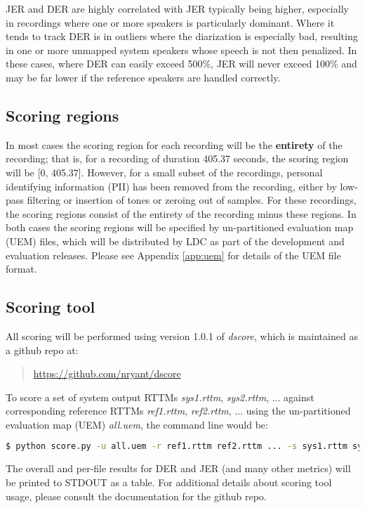 \documentclass{article}
\begin{document}
JER and DER are highly correlated with JER typically being higher, especially in recordings where one or more speakers is particularly dominant. Where it tends to track DER is in outliers where the diarization is especially bad, resulting in one or more unmapped system speakers whose speech is not then penalized. In these cases, where DER can easily exceed 500\%, JER will never exceed 100\% and may be far lower if the reference speakers are handled correctly. 


\subsection{Scoring regions}
In most cases the scoring region for each recording will be the {\bf entirety} of the recording; that is, for a recording of duration 405.37 seconds, the scoring region will be [0, 405.37]. However, for a small subset of the recordings, personal identifying information (PII) has been removed from the recording, either by low-pass filtering or insertion of tones or zeroing out of samples. For these recordings, the scoring regions consist of the entirety of the recording minus these regions. In both cases the scoring regions will be specified by un-partitioned evaluation map (UEM) files, which will be distributed by LDC as part of the development and evaluation releases. Please see Appendix \ref{app:uem} for details of the UEM file format.


\subsection{Scoring tool}
All scoring will be performed using version 1.0.1 of {\it dscore}, which is maintained as a github repo at:
    \begin{quote}
        \url{https://github.com/nryant/dscore}
    \end{quote}
To score a set of system output RTTMs {\it sys1.rttm}, {\it sys2.rttm}, ... against corresponding reference RTTMs {\it ref1.rttm}, {\it ref2.rttm}, ... using the un-partitioned evaluation map (UEM) {\it all.uem}, the command line would be:
\begin{lstlisting}[language=bash]
  $ python score.py -u all.uem -r ref1.rttm ref2.rttm ... -s sys1.rttm sys2.rttm ...
\end{lstlisting}
The overall and per-file results for DER and JER (and many other metrics) will be printed to STDOUT as a table. For additional details about scoring tool usage, please consult the documentation for the github repo.
\end{document}
